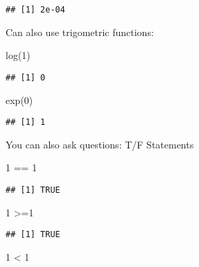 \documentclass[
]{article}
\newenvironment{Shaded}{\begin{snugshade}}{\end{snugshade}}
\newcommand{\DecValTok}[1]{\textcolor[rgb]{0.00,0.00,0.81}{#1}}
\newcommand{\FunctionTok}[1]{\textcolor[rgb]{0.00,0.00,0.00}{#1}}
\newcommand{\NormalTok}[1]{#1}
\newcommand{\SpecialCharTok}[1]{\textcolor[rgb]{0.00,0.00,0.00}{#1}}
\begin{document}
\begin{verbatim}
## [1] 2e-04
\end{verbatim}

Can also use trigometric functions:

\begin{Shaded}
\begin{Highlighting}[]
\FunctionTok{log}\NormalTok{(}\DecValTok{1}\NormalTok{)}
\end{Highlighting}
\end{Shaded}

\begin{verbatim}
## [1] 0
\end{verbatim}

\begin{Shaded}
\begin{Highlighting}[]
\FunctionTok{exp}\NormalTok{(}\DecValTok{0}\NormalTok{)}
\end{Highlighting}
\end{Shaded}

\begin{verbatim}
## [1] 1
\end{verbatim}

You can also ask questions: T/F Statements

\begin{Shaded}
\begin{Highlighting}[]
\DecValTok{1} \SpecialCharTok{==} \DecValTok{1}
\end{Highlighting}
\end{Shaded}

\begin{verbatim}
## [1] TRUE
\end{verbatim}

\begin{Shaded}
\begin{Highlighting}[]
\DecValTok{1} \SpecialCharTok{\textgreater{}=}\DecValTok{1}
\end{Highlighting}
\end{Shaded}

\begin{verbatim}
## [1] TRUE
\end{verbatim}

\begin{Shaded}
\begin{Highlighting}[]
\DecValTok{1} \SpecialCharTok{\textless{}} \DecValTok{1}
\end{Highlighting}
\end{Shaded}
\end{document}
